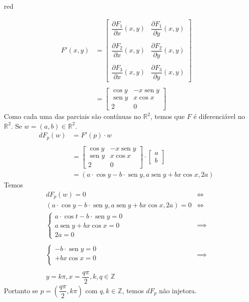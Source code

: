 \documentclass[12pt,leqno,twoside]{amsart}
\theoremstyle{definition}
\newcommand{\sen}{\operatorname{sen}}
\begin{document}
\begin{color}{red}
\begin{enumerate}
\begin{enumerate}
				\begin{align*}
					F'(x,y) &= \left[\begin{array}{cc} \dfrac{\partial F_1}{\partial x} (x,y) &\dfrac{\partial F_1}{\partial y} (x,y)  \\~\\ \dfrac{\partial F_2}{\partial x} (x,y) &\dfrac{\partial F_2}{\partial y} (x,y)  \\~\\ \dfrac{\partial F_3}{\partial x} (x,y) &\dfrac{\partial F_3}{\partial y} (x,y)  \end{array}\right] \\~\\
						&= \left[\begin{array}{cc} \cos y & -x\sen y \\ \sen y & x\cos x \\ 2 & 0  \end{array}\right]
				\end{align*}
				Como cada uma das parciais são contínuas no $\mathbb{R}^2$, temos que $F$ é diferenciável no $\mathbb{R}^2$. Se $w = (a,b) \in \mathbb{R}^2$. \\
				\begin{align*}
					dF_p(w) &= F'(p)\cdot w\\~\\
					&= \left[\begin{array}{cc} \cos y & -x\sen y \\ \sen y & x\cos x \\ 2 & 0  \end{array}\right] \cdot  \left[\begin{array}{c} a \\ b \end{array}\right] \\
						&= (a \cdot \cos y -b\cdot \sen y, a \sen y+b x\cos x , 2a)
				\end{align*}
				Temos
				\begin{align*}
					dF_p(w) = 0 &\iff \\
					(a \cdot \cos y -b\cdot \sen y, a \sen y+b x\cos x , 2a) = 0  &\iff  \\
					\begin{cases}
						a\cdot \cos t - b \cdot \sen y = 0\\
						a\sen y +b x\cos x =0\\
						2a = 0
					\end{cases} &\implies \\~\\
					\begin{cases}
						- b \cdot \sen y = 0\\
						+b x\cos x =0\\
					\end{cases} &\implies\\~\\
					y = k\pi, x = \dfrac{q\pi}{2}, k,q \in \mathbb{Z}
				\end{align*}
				Portanto se $p = \left(\dfrac{q\pi}{2}, k\pi \right)$ com $q,k \in \mathbb{Z}$, temos $dF_p$ não injetora.



\end{enumerate}
\end{enumerate}
\end{color}
\end{document}
